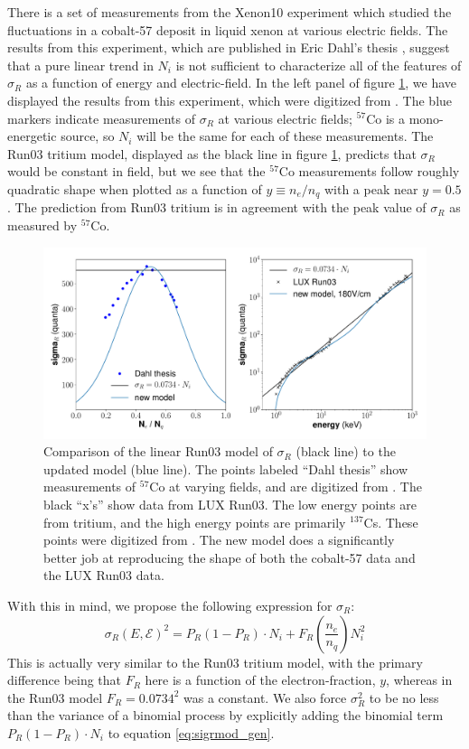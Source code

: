 There is a set of measurements from the Xenon10 experiment which studied the fluctuations in a cobalt-57 deposit in liquid xenon at various electric fields. The results from this experiment, which are published in Eric Dahl's thesis \cite{dahl}, suggest that a pure linear trend in $N_i$ is not sufficient to characterize all of the features of $\sigma_R$ as a function of energy and electric-field. In the left panel of figure \ref{fig:sigR_wRun03pDahl}, we have displayed the results from this experiment, which were digitized from \cite{dahl}. The blue markers indicate measurements of $\sigma_R$ at various electric fields; $^{57}$Co is a mono-energetic source, so $N_i$ will be the same for each of these measurements. The Run03 tritium model, displayed as the black line in figure \ref{fig:sigR_wRun03pDahl}, predicts that $\sigma_R$ would be constant in field, but we see that the $^{57}$Co measurements follow roughly quadratic shape when plotted as a function of $y\equiv n_e/n_q$ with a peak near $y=0.5$. The prediction from Run03 tritium is in agreement with the peak value of $\sigma_R$ as measured by $^{57}$Co.
\begin{figure}[!h]
\centering
  \includegraphics[width=\textwidth]{Figures/sigR_wRun03pDahl_gfdcm.pdf}
\caption{Comparison of the linear Run03 model of $\sigma_R$ (black line) to the updated model (blue line). The points labeled ``Dahl thesis'' show measurements of $^{57}$Co at varying fields, and are digitized from \cite{dahl}. The black ``x's'' show data from LUX Run03. The low energy points are from tritium, and the high energy points are primarily $^{137}$Cs. These points were digitized from \cite{lux_tritium}. The new model does a significantly better job at reproducing the shape of both the cobalt-57 data and the LUX Run03 data. }
\label{fig:sigR_wRun03pDahl}
\end{figure}

With this in mind, we propose the following expression for $\sigma_R$:
\begin{equation}\label{eq:sigrmod_gen}
\sigma_{R}(E,\mathcal{E})^2=P_{R}(1-P_{R})\cdot N_i +F_{R}(\frac{n_e}{n_q})N_i^2
\end{equation}
This is actually very similar to the Run03 tritium model, with the primary difference being that $F_R$ here is a function of the electron-fraction, $y$, whereas in the Run03 model $F_R=0.0734^2$ was a constant. We also force $\sigma_R^2$ to be no less than the variance of a binomial process by explicitly adding the binomial term $P_{R}(1-P_{R})\cdot N_i$ to equation \ref{eq:sigrmod_gen}.

